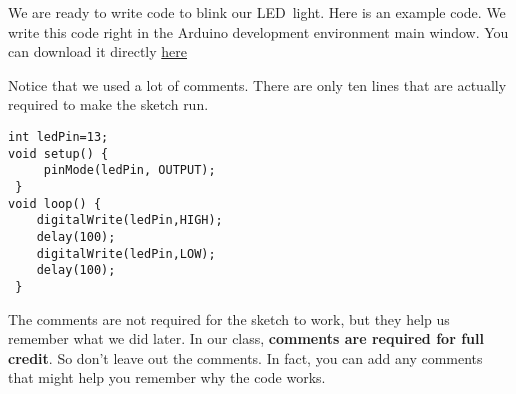 We are ready to write code to blink our LED\ light. Here is an example code.
We write this code right in the Arduino development environment main window. You can download it directly \href{https://dtoliphant.github.io/PH250Manual/Code/IntroBlink.ino}{here}



% 
% 
% 
% 
% 
% 

Notice that we used a lot of comments. There are only ten lines that are
actually required to make the sketch run.

\begin{lstlisting}[language=Arduino] 
int ledPin=13;
void setup() {
	 pinMode(ledPin, OUTPUT);
 }
void loop() {
	digitalWrite(ledPin,HIGH);
	delay(100);
	digitalWrite(ledPin,LOW);
	delay(100);
 }
\end{lstlisting}

The comments are not required for the sketch to work, but they help us
remember what we did later. In our class, \textbf{comments are required for
full credit}. So don't leave out the comments. In fact, you can add any
comments that might help you remember why the code works.


